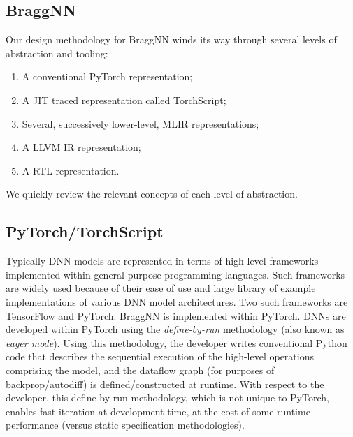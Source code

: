 \subsection{BraggNN}\label{subsec:braggnn}
Our design methodology for BraggNN winds its way through several levels of abstraction and tooling:

\begin{enumerate}
    \item A conventional PyTorch representation;
    \item A JIT traced representation called TorchScript;
    \item Several, successively lower-level, MLIR representations;
    \item A LLVM IR representation;
    \item A RTL representation.
\end{enumerate}

We quickly review the relevant concepts of each level of abstraction.

\subsection{PyTorch/TorchScript}\label{subsec:pytorch}

Typically DNN models are represented in terms of high-level frameworks implemented within general purpose programming languages.
Such frameworks are widely used because of their ease of use and large library of example implementations of various DNN model architectures.
Two such frameworks are TensorFlow and PyTorch.
BraggNN is implemented within PyTorch.
DNNs are developed within PyTorch using the \emph{define-by-run} methodology (also known as \emph{eager mode}).
Using this methodology, the developer writes conventional Python code that describes the sequential execution of the high-level operations comprising the model, and the dataflow graph (for purposes of backprop/autodiff) is defined/constructed at runtime.
With respect to the developer, this define-by-run methodology, which is not unique to PyTorch, enables fast iteration at development time, at the cost of some runtime performance (versus static specification methodologies).

